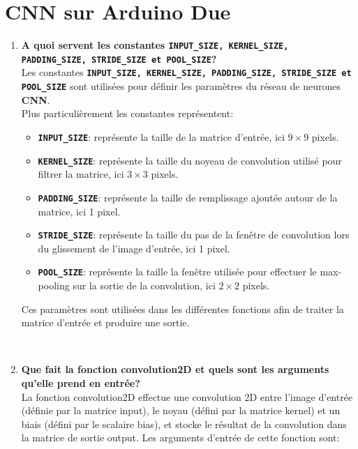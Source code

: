 \documentclass[a4paper, 12pt, openany]{book}
\begin{document}
\chapter{CNN sur Arduino Due}
\begin{enumerate}
  \item {
    \textbf{A quoi servent les constantes \lstinline{INPUT_SIZE, KERNEL_SIZE, PADDING_SIZE, STRIDE_SIZE et POOL_SIZE}?} \vspace{0.2cm}\\
    Les constantes \textbf{\lstinline{INPUT_SIZE, KERNEL_SIZE, PADDING_SIZE, STRIDE_SIZE et POOL_SIZE}} sont utilisées pour définir les paramètres du réseau de neurones \textbf{CNN}. \\
    Plus particulièrement les constantes représentent:
    \begin{itemize}
      \item \textbf{\lstinline{INPUT_SIZE}}: représente la taille de la matrice d'entrée, ici $9 \times 9$ pixels.
      \item \textbf{\lstinline{KERNEL_SIZE}}: représente la taille du noyeau de convolution utilisé pour filtrer la matrice, ici $3 \times 3$ pixels.
      \item \textbf{\lstinline{PADDING_SIZE}}: représente la taille de remplissage ajoutée autour de la matrice, ici 1 pixel.
      \item \textbf{\lstinline{STRIDE_SIZE}}: représente la taille du pas de la fenêtre de convolution lors du glissement de l'image d'entrée, ici 1 pixel.
      \item \textbf{\lstinline{POOL_SIZE}}: représente la taille la fenêtre utilisée pour effectuer le max-pooling sur la sortie de la convolution, ici $2 \times 2$ pixels.
    \end{itemize}
    Ces paramètres sont utilisées dans les différentes fonctions afin de traiter la matrice d'entrée et produire une sortie.
  } \\
  \item {
    \textbf{Que fait la fonction convolution2D et quels sont les arguments qu'elle prend en entrée?} \vspace{0.2cm}\\ 
    La fonction convolution2D effectue une convolution 2D entre l'image d'entrée (définie par la matrice input), le noyau (défini par la matrice kernel) et un biais (défini par le scalaire bias), et stocke le résultat de la convolution dans la matrice de sortie output.
    Les arguments d'entrée de cette fonction sont:
    \begin{itemize}

\end{itemize}}
\end{enumerate}
\end{document}
